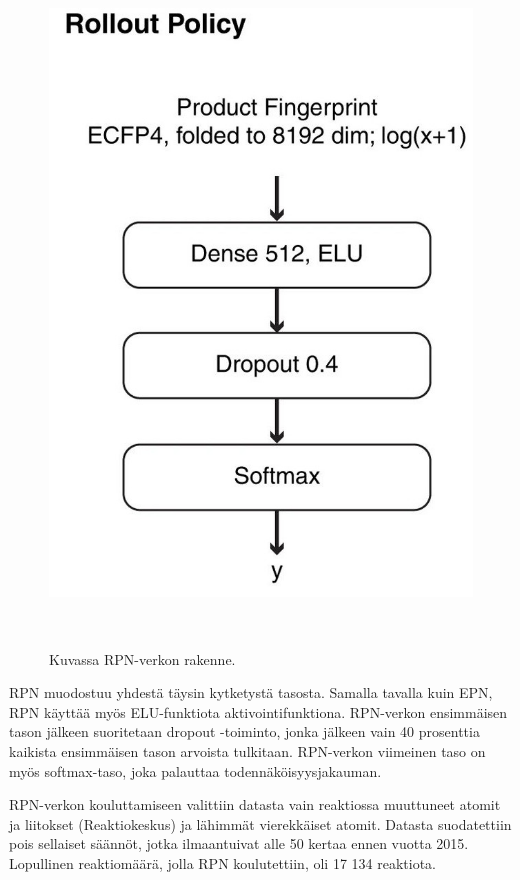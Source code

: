 \documentclass[finnish,twoside,censored,tkt,sw-line]{HYthesisML}
\begin{document}
\begin{figure}[!ht]
    \centering
    \includegraphics[]{rollout-policy.jpg}
    \caption{Kuvassa RPN-verkon rakenne.}
    {~\cite{SeglerMarwinHS2018Pcsw}}
    \label{fig:3n-mcts-rpn}
\end{figure}


RPN muodostuu yhdestä täysin kytketystä tasosta.
Samalla tavalla kuin EPN, RPN käyttää myös ELU-funktiota aktivointifunktiona.
RPN-verkon ensimmäisen tason jälkeen suoritetaan dropout -toiminto, jonka jälkeen vain 40 prosenttia kaikista ensimmäisen tason arvoista tulkitaan.
RPN-verkon viimeinen taso on myös softmax-taso, joka palauttaa todennäköisyysjakauman.

RPN-verkon kouluttamiseen valittiin datasta vain reaktiossa muuttuneet atomit ja liitokset (Reaktiokeskus) ja lähimmät vierekkäiset atomit.
Datasta suodatettiin pois sellaiset säännöt, jotka ilmaantuivat alle 50 kertaa ennen vuotta 2015.
Lopullinen reaktiomäärä, jolla RPN koulutettiin, oli 17 134 reaktiota.
\end{document}
